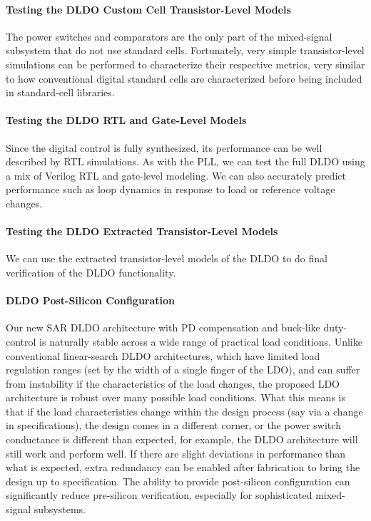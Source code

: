 \paragraph{Testing the DLDO Custom Cell Transistor-Level Models}
The power switches and comparators are the only part of the mixed-signal
subsystem that do not use standard cells. Fortunately, very simple
transistor-level simulations can be performed to characterize their
respective metrics, very similar to how conventional digital standard
cells are characterized before being included in standard-cell libraries.

\paragraph{Testing the DLDO RTL and Gate-Level Models}
Since the digital control is fully synthesized, its performance can be
well described by RTL simulations. As with the PLL, we can test the full
DLDO using a mix of Verilog RTL and gate-level modeling. We can also
accurately predict performance such as loop dynamics in response to load
or reference voltage changes. 

\paragraph{Testing the DLDO Extracted Transistor-Level Models}
We can use the extracted transistor-level models of the DLDO to do final
verification of the DLDO functionality. 

\paragraph{DLDO Post-Silicon Configuration}
Our new SAR DLDO architecture with PD compensation and buck-like
duty-control is naturally stable across a wide range of practical load
conditions. Unlike conventional linear-search DLDO architectures, which
have limited load regulation ranges (set by the width of a single finger
of the LDO), and can suffer from instability if the characteristics of
the load changes, the proposed LDO architecture is robust over many
possible load conditions. What this means is that if the load
characteristics change within the design process (say via a change in
specifications), the design comes in a different corner, or the power
switch conductance is different than expected, for example, the DLDO
architecture will still work and perform well. If there are slight
deviations in performance than what is expected, extra redundancy can be
enabled after fabrication to bring the design up to specification. The
ability to provide post-silicon configuration can significantly reduce
pre-silicon verification, especially for sophisticated mixed-signal
subsystems.

